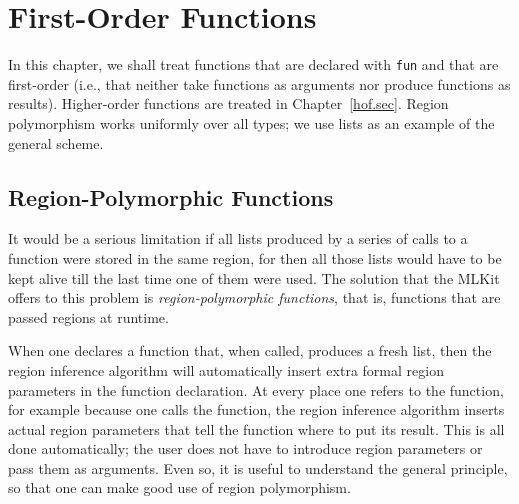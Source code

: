 \documentclass[12pt]{book}
\begin{document}
\chapter{First-Order Functions}
In this chapter, we shall treat
%
%
functions that are declared with
{\tt fun} and that are first-order (i.e., that neither take functions
as arguments nor produce functions as results). Higher-order functions
are treated in Chapter~\ref{hof.sec}.  Region polymorphism works
uniformly over all types; we use lists as an example of the general
scheme.

\section{Region-Polymorphic Functions}
\label{region-polymorphic-functions.sec}
%
It would be a serious limitation if all lists produced by a series of
calls to a function were stored in the same region, for then all those
lists would have to be kept alive till the last time one of them were
used. The solution that the MLKit offers to this problem is {\em
  region-polymorphic functions}, that is, functions that are passed
regions at runtime.

When one declares a function that, when called, produces a fresh list,
then the region inference algorithm will automatically insert extra
%
formal region parameters in the function declaration.  At every place
one refers to the function, for example because one calls the
function, the region inference algorithm inserts
%
actual region parameters that tell the function where to put its
result. This is all done automatically; the user does not have to
introduce region parameters or pass them as arguments. Even so, it is
useful to understand the general principle, so that one can make good
use of region polymorphism.
\end{document}
